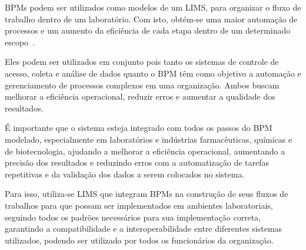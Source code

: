 
BPMs podem ser utilizados como modelos de um LIMS, para organizar o fluxo de trabalho dentro de um laboratório. Com isto, obtém-se uma maior automação de processos e um aumento da eficiência de cada etapa dentro de um determinado escopo~\cite{Key2011LIMS:Systems}.

Eles podem ser utilizados em conjunto pois tanto os sistemas de controle de acesso, coleta e análise de dados quanto o BPM têm como objetivo a automação e gerenciamento de processos complexos em uma organização. Ambos buscam melhorar a eficiência operacional, reduzir erros e aumentar a qualidade dos resultados.

É importante que o sistema esteja integrado com todos os passos do BPM modelado, especialmente em laboratórios e indústrias farmacêuticas, químicas e de biotecnologia, ajudando a melhorar a eficiência operacional, aumentando a precisão dos resultados e reduzindo erros com a automatização de tarefas repetitivas e da validação dos dados a serem colocados no sistema.

Para isso, utiliza-se LIMS que integram BPMs na construção de seus fluxos de trabalhos para que possam ser implementados em ambientes laboratoriais, seguindo todos os padrões necessários para sua implementação correta, garantindo a compatibilidade e a interoperabilidade entre diferentes sistemas utilizados, podendo ser utilizado por todos os funcionários da organização.

